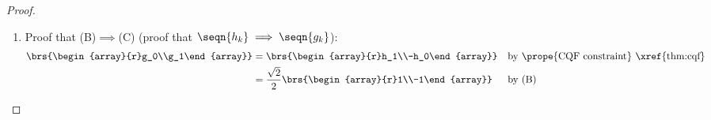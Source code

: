 \begin{proof}
\begin{enumerate}
\begin{enumerate}
      \item Proof for the values of $\seqn{h_k}$ (B):\label{item:N0_hg_h}
        \begin{align*}
          \brs{\begin{array}{r}h_0\\h_1\end{array}}
             = \opAi\opA\brs{\begin{array}{r}h_0\\h_1\end{array}}
            &= \opAi\brs{\begin{array}{rr}1 & 1\\1 & -1\end{array}}\brs{\begin{array}{r}h_0\\h_1\end{array}}
            && \text{by \pref{ilem:N0_hg_Ah}}
          \\&= \opAi\brs{\begin{array}{r}\sqrt{2}\\0\end{array}}
            && \text{by \pref{ilem:N0_hg_Ah}}
          \\&= \frac{1}{2}\brs{\begin{array}{rr}1 & 1\\1 & -1\end{array}}
                          \brs{\begin{array}{r}\sqrt{2}\\0\end{array}}
            && \text{by \pref{ilem:N0_hg_Ai}}
          \\&= \frac{\sqrt{2}}{2}\brs{\begin{array}{r}1\\1\end{array}}
        \end{align*}

    \end{enumerate}

  \item Proof that (B)$\implies$(C) (proof that $\seqn{h_k}\implies\seqn{g_k}$): %
    \begin{align*}
      \brs{\begin{array}{r}g_0\\g_1\end{array}}
        &= \brs{\begin{array}{r}h_1\\-h_0\end{array}}
        && \text{by \prope{CQF constraint} \xref{thm:cqf}}
      \\&= \frac{\sqrt{2}}{2}\brs{\begin{array}{r}1\\-1\end{array}}
        && \text{by (B)}
    \end{align*}


\end{enumerate}
\end{proof}
